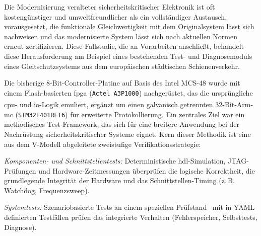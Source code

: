 Die Modernisierung veralteter sicherheitskritischer Elektronik ist oft kostengünstiger und umweltfreundlicher als ein vollständiger Austausch, vorausgesetzt, die funktionale Gleichwertigkeit mit dem Originalsystem lässt sich nachweisen und das modernisierte System lässt sich nach aktuellen Normen erneut zertifizieren. Diese Fallstudie, die an Vorarbeiten anschließt, behandelt diese Herausforderung am Beispiel eines bestehenden Test- und Diagnosemoduls eines Gleitschutzsystems aus dem europäischen städtischen Schienenverkehr.

Die bisherige 8-Bit-Controller-Platine auf Basis des Intel MCS-48 wurde mit einem Flash-basierten \gls{fpga} (\texttt{Actel~A3P1000}) nachgerüstet, das die ursprüngliche \gls{cpu}- und \gls{io}-Logik emuliert, ergänzt um einen galvanisch getrennten 32-Bit-Arm\textsuperscript{\textregistered}-\gls{mc} (\texttt{STM32F401RET6}) für erweiterte Protokollierung. Ein zentrales Ziel war ein methodisches Test-Framework, das sich für eine breitere Anwendung bei der Nachrüstung sicherheitskritischer Systeme eignet. Kern dieser Methodik ist eine aus dem V-Modell abgeleitete zweistufige Verifikationsstrategie:
\begin{enumerate*}[label=(\arabic*)]
	\item \textit{Komponenten- und Schnittstellentests:} Deterministische \gls{hdl}-Simulation, JTAG-Prüfungen und Hardware-Zeitmessungen überprüfen die logische Korrektheit, die grundlegende Integrität der Hardware und das Schnittstellen-Timing (z.\,B. Watchdog, Frequenzsweep).
	\item \textit{Systemtests:} Szenariobasierte Tests an einem speziellen Prüfstand~\cite{dolata2023} mit in YAML definierten Testfällen prüfen das integrierte Verhalten (Fehlerspeicher, Selbsttests, Diagnose).
\end{enumerate*}
